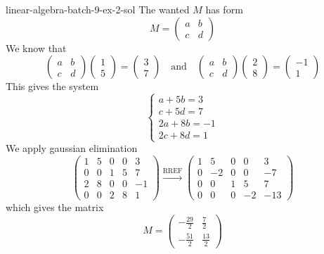 \documentclass[preview]{standalone}
\begin{document}
\begin{snippetsolution}{linear-algebra-batch-9-ex-2-sol}{}
    The wanted \matrix \(M\) has form
    \[
        M = \begin{pmatrix}
            a & b \\
            c & d
        \end{pmatrix}
    \]
    We know that
    \[
        \begin{pmatrix}
            a & b \\
            c & d
        \end{pmatrix} \begin{pmatrix}
            1 \\
            5
        \end{pmatrix} = \begin{pmatrix}
            3 \\
            7
        \end{pmatrix}
        \quad \text{and} \quad
        \begin{pmatrix}
            a & b \\
            c & d
        \end{pmatrix} \begin{pmatrix}
            2 \\
            8
        \end{pmatrix} = \begin{pmatrix}
            -1 \\
            1
        \end{pmatrix}
    \]
    This gives the system
    \[
        \begin{cases}
            a + 5b = 3 \\
            c + 5d = 7 \\
            2a + 8b = -1 \\
            2c + 8d = 1
        \end{cases}
    \]
    We apply gaussian elimination
    \[
        \begin{pmatrix}
            1 & 5 & 0 & 0 & 3 \\
            0 & 0 & 1 & 5 & 7 \\
            2 & 8 & 0 & 0 & -1 \\
            0 & 0 & 2 & 8 & 1
        \end{pmatrix}
        \xrightarrow{\text{RREF}}
        \begin{pmatrix}
            1 & 5 & 0 & 0 & 3 \\
            0 & -2 & 0 & 0 & -7 \\
            0 & 0 & 1 & 5 & 7 \\
            0 & 0 & 0 & -2 & -13
        \end{pmatrix}
    \]
    which gives the matrix
    \[
        M = \begin{pmatrix}
            -\frac{29}{2} & \frac{7}{2} \\
            -\frac{51}{2} & \frac{13}{2}
        \end{pmatrix}
    \]
\end{snippetsolution}
\end{document}
